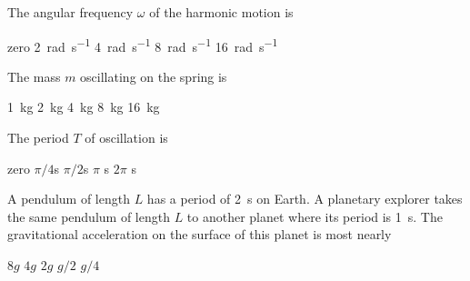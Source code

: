 \documentclass{../../../oss-classkick-exam}
\begin{document}
\begin{multicols*}{2}
\begin{questions}

    \question The angular frequency $\omega$ of the harmonic motion is
    \begin{choices}
      \choice zero
      \choice\SI{2}{rad\per\second}
      \choice\SI{4}{rad\per\second}
      \choice\SI{8}{rad\per\second}
      \choice\SI{16}{rad\per\second}
    \end{choices}
    \label{first}

    \question The mass $m$ oscillating on the spring is
    \begin{choices}
      \choice\SI{1}{\kilo\gram}
      \choice\SI{2}{\kilo\gram}
      \choice\SI{4}{\kilo\gram}
      \choice\SI{8}{\kilo\gram}
      \choice\SI{16}{\kilo\gram}
    \end{choices}
    
    \question The period $T$ of oscillation is
    \begin{choices}
      \choice zero
      \choice $\pi/4$\si{\second}
      \choice $\pi/2$\si{\second}
      \choice $\pi$  \si{\second}
      \choice $2\pi$ \si{\second}
    \end{choices}
    \label{last}
    
    \question A pendulum of length $L$ has a period of \SI{2}{\second} on
    Earth. A planetary explorer takes the same pendulum of length $L$ to
    another planet where its period is \SI{1}{\second}. The gravitational
    acceleration on the surface of this planet is most nearly
    \begin{choices}
      \choice $8g$
      \choice $4g$
      \choice $2g$
      \choice $g/2$
      \choice $g/4$
    \end{choices}
  \end{questions}
\end{multicols*}
\newpage
\end{document}
